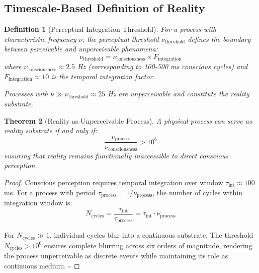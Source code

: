 \documentclass[12pt,a4paper]{article}
\newtheorem{theorem}{Theorem}[section]
\newtheorem{definition}[theorem]{Definition}
\begin{document}
\subsection{Timescale-Based Definition of Reality}

\begin{definition}[Perceptual Integration Threshold]
For a process with characteristic frequency $\nu$, the perceptual threshold $\nu_{\text{threshold}}$ defines the boundary between perceivable and unperceivable phenomena:
\begin{equation}
\nu_{\text{threshold}} = \nu_{\text{consciousness}} \times F_{\text{integration}}
\end{equation}
where $\nu_{\text{consciousness}} \approx 2.5$ Hz (corresponding to 100-500 ms conscious cycles) and $F_{\text{integration}} \approx 10$ is the temporal integration factor.

Processes with $\nu \gg \nu_{\text{threshold}} \approx 25$ Hz are unperceivable and constitute the reality substrate.
\end{definition}

\begin{theorem}[Reality as Unperceivable Process]\label{thm:reality-unperceivable}
A physical process can serve as reality substrate if and only if:
\begin{equation}
\frac{\nu_{\text{process}}}{\nu_{\text{consciousness}}} > 10^6
\end{equation}
ensuring that reality remains functionally inaccessible to direct conscious perception.
\end{theorem}

\begin{proof}
Conscious perception requires temporal integration over window $\tau_{\text{int}} \approx 100$ ms. For a process with period $\tau_{\text{process}} = 1/\nu_{\text{process}}$, the number of cycles within integration window is:
\begin{equation}
N_{\text{cycles}} = \frac{\tau_{\text{int}}}{\tau_{\text{process}}} = \tau_{\text{int}} \cdot \nu_{\text{process}}
\end{equation}

For $N_{\text{cycles}} \gg 1$, individual cycles blur into a continuous substrate. The threshold $N_{\text{cycles}} > 10^6$ ensures complete blurring across six orders of magnitude, rendering the process unperceivable as discrete events while maintaining its role as continuous medium. $\square$
\end{proof}
\end{document}

